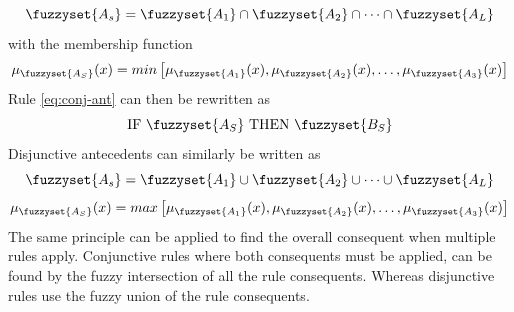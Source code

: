 \[ \fuzzyset{A_s}=\fuzzyset{A_1}\cap \fuzzyset{A_2} \cap \dots \cap \fuzzyset{A_L} \]
with the membership function
\[ \mu_{\fuzzyset{A_S}}(x)=min \left [\mu_{\fuzzyset{A_1}}(x),\mu_{\fuzzyset{A_2}}(x),\dots,\mu_{\fuzzyset{A_3}}(x) \right ] \]
Rule \ref{eq:conj-ant} can then be rewritten as
\[ \text{IF $\fuzzyset{A_S}$ THEN $\fuzzyset{B_S}$} \]
Disjunctive antecedents can similarly be written as
\[ \fuzzyset{A_s}=\fuzzyset{A_1}\cup \fuzzyset{A_2} \cup \dots \cup \fuzzyset{A_L} \]
\[ \mu_{\fuzzyset{A_S}}(x)=max \left [\mu_{\fuzzyset{A_1}}(x),\mu_{\fuzzyset{A_2}}(x),\dots,\mu_{\fuzzyset{A_3}}(x) \right ] \]
The same principle can be applied to find the overall consequent when multiple rules apply. Conjunctive rules where both consequents must be applied, can be found by  the fuzzy intersection of all the rule consequents. Whereas disjunctive rules use the fuzzy union of the rule consequents.

